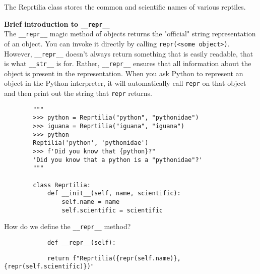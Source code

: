 \begin{blocksection}
    \question The Reprtilia class stores the common and scientific names of various reptiles.
    
    \textbf{Brief introduction to \lstinline{__repr__}} \\ The \lstinline{__repr__} magic method of objects returns the "official" string representation of an object. You can invoke it directly by calling \lstinline{repr(<some object>)}. However, \lstinline{__repr__} doesn't always return something that is easily readable, that is what \lstinline{__str__} is for. Rather, \lstinline{__repr__} ensures that all information about the object is present in the representation. When you ask Python to represent an object in the Python interpreter, it will automatically call \lstinline{repr} on that object and then print out the string that \lstinline{repr} returns.
    
    \vspace{1.5\baselineskip}
    
    \begin{lstlisting}
        """
        >>> python = Reprtilia("python", "pythonidae")
        >>> iguana = Reprtilia("iguana", "iguana")
        >>> python
        Reptilia('python', 'pythonidae')
        >>> f'Did you know that {python}?"
        'Did you know that a python is a "pythonidae"?'
        """
    
        class Reprtilia:
            def __init__(self, name, scientific):
                self.name = name
                self.scientific = scientific
    \end{lstlisting}
\end{blocksection}
    
\begin{blocksection}
    \question How do we define the \lstinline{__repr__} method?

    \vspace{1.5\baselineskip}
    
    \begin{lstlisting}
            def __repr__(self):
    \end{lstlisting}
    \begin{solution}[0.25in]
    \begin{lstlisting}
            return f"Reprtilia({repr(self.name)}, {repr(self.scientific)})"
    \end{lstlisting}
    \end{solution}
\end{blocksection}

